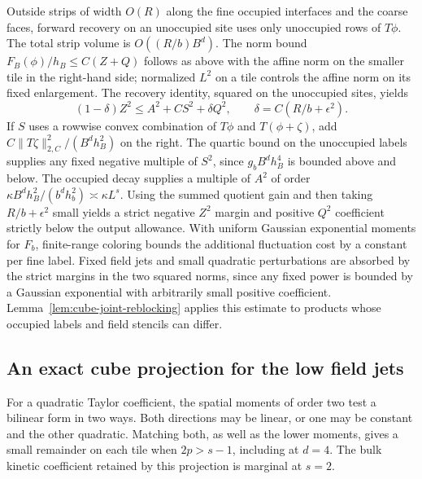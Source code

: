 \documentclass[11pt]{article}
\theoremstyle{definition}
\begin{document}
Outside strips of width \(O(R)\) along the fine occupied
interfaces and the coarse faces, forward recovery on an
unoccupied site uses only unoccupied rows of \(T\phi\).
The total strip volume is \(O((R/b)B^d)\). The norm bound
\(F_B(\phi)/h_B\le C(Z+Q)\) follows as above with the affine
norm on the smaller tile in the right-hand side; normalized
\(L^2\) on a tile controls the affine norm on its fixed
enlargement. The recovery identity, squared on the
unoccupied sites, yields
\begin{equation}
 (1-\delta)Z^2\le A^2+C S^2+\delta Q^2,\qquad
 \delta=C(R/b+\epsilon^2).
\end{equation}
If \(S\) uses a rowwise convex combination of \(T\phi\) and
\(T(\phi+\zeta)\), add
\(C\|T\zeta\|_{2,C}^2/(B^d h_B^2)\) on the right.
The quartic bound on the unoccupied labels supplies any
fixed negative multiple of \(S^2\), since \(g_b B^d h_B^4\)
is bounded above and below. The occupied decay supplies
a multiple of \(A^2\) of order
\(\kappa B^d h_B^2/(b^d h_b^2)\asymp \kappa L^s\).
Using the summed quotient gain and then taking \(R/b+\epsilon^2\)
small yields a strict negative \(Z^2\) margin and positive
\(Q^2\) coefficient strictly below the output allowance.
With uniform Gaussian exponential moments for \(F_b\),
finite-range coloring bounds the additional fluctuation cost
by a constant per fine label. Fixed field jets and small
quadratic perturbations are absorbed by the strict margins in the
two squared norms, since any fixed power is bounded by a Gaussian
exponential with arbitrarily small positive coefficient. Lemma~\ref{lem:cube-joint-reblocking}
applies this estimate to products whose occupied labels and
field stencils can differ.

\subsection{An exact cube projection for the low field jets}
\label{sec:cube-jet-projection}

For a quadratic Taylor coefficient, the spatial moments of order
two test a bilinear form in two ways. Both directions may be linear,
or one may be constant and the other quadratic. Matching both,
as well as the lower moments, gives a small remainder on each tile
when \(2p>s-1\), including at \(d=4\). The bulk kinetic coefficient
retained by this projection is marginal at \(s=2\).
\end{document}
